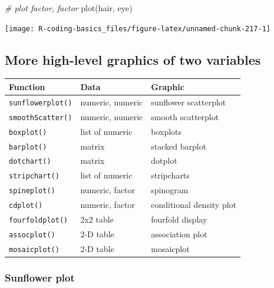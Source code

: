 \documentclass[
]{book}
\newenvironment{Shaded}{\begin{snugshade}}{\end{snugshade}}
\newcommand{\CommentTok}[1]{\textcolor[rgb]{0.56,0.35,0.01}{\textit{#1}}}
\newcommand{\FunctionTok}[1]{\textcolor[rgb]{0.00,0.00,0.00}{#1}}
\newcommand{\NormalTok}[1]{#1}
\begin{document}
\begin{Shaded}
\begin{Highlighting}[]
\CommentTok{\# plot factor, factor}
\FunctionTok{plot}\NormalTok{(hair, eye)}
\end{Highlighting}
\end{Shaded}

\begin{center}\texttt{[image: R-coding-basics\_files/figure-latex/unnamed-chunk-217-1]} \end{center}

\hypertarget{more-high-level-graphics-of-two-variables}{%
\subsection{More high-level graphics of two variables}\label{more-high-level-graphics-of-two-variables}}

\begin{longtable}[]{@{}lll@{}}
\toprule()
Function & Data & Graphic \\
\midrule()
\endhead
\texttt{sunflowerplot()} & numeric, numeric & sunflower scatterplot \\
\texttt{smoothScatter()} & numeric, numeric & smooth scatterplot \\
\texttt{boxplot()} & list of numeric & boxplots \\
\texttt{barplot()} & matrix & stacked barplot \\
\texttt{dotchart()} & matrix & dotplot \\
\texttt{stripchart()} & list of numeric & stripcharts \\
\texttt{spineplot()} & numeric, factor & spinogram \\
\texttt{cdplot()} & numeric, factor & conditional density plot \\
\texttt{fourfoldplot()} & 2x2 table & fourfold display \\
\texttt{assocplot()} & 2-D table & association plot \\
\texttt{mosaicplot()} & 2-D table & mosaicplot \\
\bottomrule()
\end{longtable}

\hypertarget{sunflower-plot}{%
\subsubsection*{Sunflower plot}\label{sunflower-plot}}
\end{document}
